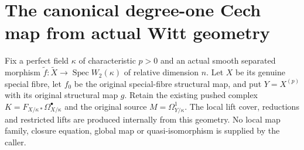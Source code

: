 \section{The canonical degree-one Cech map from actual Witt geometry}

Fix a perfect field $\kappa$ of characteristic $p>0$ and an actual smooth
separated morphism $\widetilde f:\widetilde X\to\operatorname{Spec}W_2(\kappa)$
of relative dimension $n$. Let $X$ be its genuine special fibre, let $f_0$
be the original special-fibre structural map, and put $Y=X^{(p)}$ with its
original structural map $g$. Retain the existing pushed complex
$K=F_{X/\kappa*}\Omega^\bullet_{X/\kappa}$ and the original source
$M=\Omega^1_{Y/\kappa}$. The local lift cover, reductions and restricted
lifts are produced internally from this geometry. No local map family,
closure equation, global map or quasi-isomorphism is supplied by the caller.

